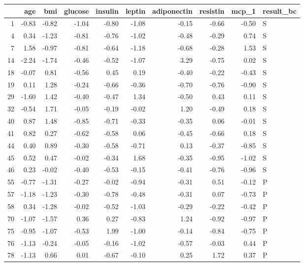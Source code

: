 \begin{table}[ht]
\centering
\begin{tabular}{rrrrrrrrrl}
  \hline
 & age & bmi & glucose & insulin & leptin & adiponectin & resistin & mcp\_1 & result\_bc \\ 
  \hline
1 & -0.83 & -0.82 & -1.04 & -0.80 & -1.08 & -0.15 & -0.66 & -0.50 & S \\ 
  4 & 0.34 & -1.23 & -0.81 & -0.76 & -1.02 & -0.48 & -0.29 & 0.74 & S \\ 
  7 & 1.58 & -0.97 & -0.81 & -0.64 & -1.18 & -0.68 & -0.28 & 1.53 & S \\ 
  14 & -2.24 & -1.74 & -0.46 & -0.52 & -1.07 & 3.29 & -0.75 & 0.02 & S \\ 
  18 & -0.07 & 0.81 & -0.56 & 0.45 & 0.19 & -0.40 & -0.22 & -0.43 & S \\ 
  19 & 0.11 & 1.28 & -0.24 & -0.66 & -0.36 & -0.70 & -0.76 & -0.90 & S \\ 
  29 & -1.60 & 1.42 & -0.40 & -0.47 & 1.34 & -0.50 & 0.43 & 0.11 & S \\ 
  32 & -0.54 & 1.71 & -0.05 & -0.19 & -0.02 & 1.20 & -0.49 & 0.18 & S \\ 
  40 & 0.87 & 1.48 & -0.85 & -0.71 & -0.33 & -0.35 & 0.06 & -0.01 & S \\ 
  41 & 0.82 & 0.27 & -0.62 & -0.58 & 0.06 & -0.45 & -0.66 & 0.18 & S \\ 
  44 & 0.40 & 0.89 & -0.30 & -0.58 & -0.71 & 0.13 & -0.37 & -0.85 & S \\ 
  45 & 0.52 & 0.47 & -0.02 & -0.34 & 1.68 & -0.35 & -0.95 & -1.02 & S \\ 
  46 & 0.23 & -0.02 & -0.40 & -0.53 & -0.15 & -0.41 & -0.76 & -0.96 & S \\ 
  55 & -0.77 & -1.31 & -0.27 & -0.02 & -0.94 & -0.31 & 0.51 & -0.12 & P \\ 
  57 & -1.18 & -1.23 & -0.30 & -0.78 & -0.48 & -0.31 & 0.07 & -0.73 & P \\ 
  58 & 0.34 & -1.28 & -0.02 & -0.52 & -1.03 & -0.29 & -0.22 & -0.42 & P \\ 
  70 & -1.07 & -1.57 & 0.36 & 0.27 & -0.83 & 1.24 & -0.92 & -0.97 & P \\ 
  75 & -0.95 & -1.07 & -0.53 & 1.99 & -1.00 & -0.14 & -0.84 & -0.75 & P \\ 
  76 & -1.13 & -0.24 & -0.05 & -0.16 & -1.02 & -0.57 & -0.03 & 0.44 & P \\ 
  78 & -1.13 & 0.66 & 0.01 & -0.67 & -0.10 & 0.25 & 1.72 & 0.37 & P \\ 

\end{tabular}
\end{table}
